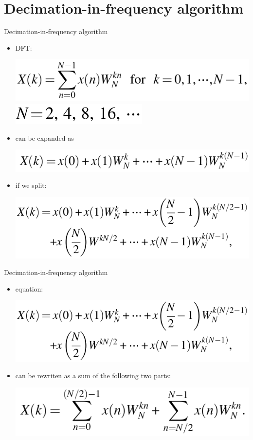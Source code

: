 \documentclass[pdflatex,compress,mathserif]{beamer}
\begin{document}
\section{Decimation-in-frequency algorithm}

\begin{frame}{Decimation-in-frequency algorithm}
	\begin{itemize}
		\item DFT:
		\begin{center}
			\includegraphics[width=0.7\linewidth]{img/img01}
			\includegraphics[width=0.3\linewidth]{img/img02}
		\end{center}
		\item can be expanded as
		\begin{center}
			\includegraphics[width=0.7\linewidth]{img/img03}
		\end{center}
		\item if we split:
		\begin{center}
			\includegraphics[width=0.7\linewidth]{img/img04}
		\end{center}
	\end{itemize}
\end{frame}

\begin{frame}{Decimation-in-frequency algorithm}
	\begin{itemize}
		\item equation:
		\begin{center}
			\includegraphics[width=0.7\linewidth]{img/img04}
		\end{center}
		\item can be rewriten as a sum of the following two parts:
		\begin{center}
			\includegraphics[width=0.7\linewidth]{img/img05}
		\end{center}
	\end{itemize}
\end{frame}
\end{document}
